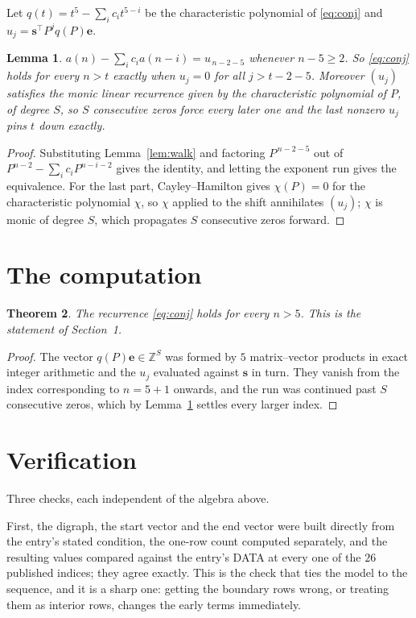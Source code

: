 \documentclass[11pt,a4paper]{article}
\theoremstyle{plain}
\newtheorem{theorem}{Theorem}
\newtheorem{lemma}[theorem]{Lemma}
\theoremstyle{definition}
\begin{document}
Let $q(t)=t^{5}-\sum_i c_i t^{5-i}$ be the characteristic polynomial of
\eqref{eq:conj} and $u_j=\mathbf{s}^{\!\top}P^{j}q(P)\mathbf{e}$.

\begin{lemma}\label{lem:crit}
$a(n)-\sum_i c_i a(n-i)=u_{\,n-2-5}$ whenever $n-5\ge2$. So \eqref{eq:conj}
holds for every $n>t$ exactly when $u_j=0$ for all $j>t-2-5$. Moreover $(u_j)$
satisfies the monic linear recurrence given by the characteristic polynomial of $P$, of
degree $S$, so $S$ consecutive zeros force every later one and the last nonzero $u_j$ pins
$t$ down exactly.
\end{lemma}

\begin{proof}
Substituting Lemma~\ref{lem:walk} and factoring $P^{\,n-2-5}$ out of
$P^{n-2}-\sum_i c_i P^{n-i-2}$ gives the identity, and letting the exponent run gives the
equivalence. For the last part, Cayley--Hamilton gives $\chi(P)=0$ for the characteristic
polynomial $\chi$, so $\chi$ applied to the shift annihilates $(u_j)$; $\chi$ is monic of
degree $S$, which propagates $S$ consecutive zeros forward.
\end{proof}

\section{The computation}

\begin{theorem}
The recurrence \eqref{eq:conj} holds for every $n>5$. This is the statement of
Section~1.
\end{theorem}

\begin{proof}
The vector $q(P)\mathbf{e}\in\mathbb{Z}^{S}$ was formed by $5$ matrix--vector
products in exact integer arithmetic and the $u_j$ evaluated against $\mathbf{s}$ in turn.
They vanish from the index corresponding to $n=5+1$ onwards, and the run was continued
past $S$ consecutive zeros, which by Lemma~\ref{lem:crit} settles every larger index.
\end{proof}

\section{Verification}

Three checks, each independent of the algebra above.

First, the digraph, the start vector and the end vector were built directly from the
entry's stated condition, the one-row count computed separately, and the resulting values
compared against the entry's DATA at every one of the $26$ published indices; they
agree exactly. This is the check that ties the model to the sequence, and it is a sharp one:
getting the boundary rows wrong, or treating them as interior rows, changes the early terms
immediately.
\end{document}
